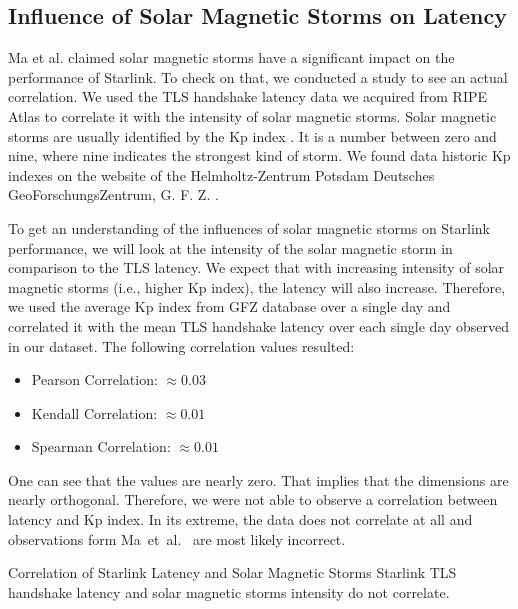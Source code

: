 \subsection{Influence of Solar Magnetic Storms on Latency}
\label{sec:solarmagnetic-storms}

Ma et al. \cite{DBLP:conf/infocom/MaCZCML23} claimed solar magnetic storms have
a significant impact on the performance of Starlink. To check on that, we
conducted a study to see an actual correlation. We used the TLS handshake
latency data we acquired from RIPE Atlas to correlate it with the intensity of
solar magnetic storms. Solar magnetic storms are usually identified by the Kp
index \cite{Bartels1957}. It is a number between zero and nine, where nine
indicates the strongest kind of storm. We found data historic Kp indexes on the
website of the Helmholtz-Zentrum Potsdam Deutsches GeoForschungsZentrum, G. F.
Z. \cite{GFZ2023}.

To get an understanding of the influences of solar magnetic storms on Starlink
performance, we will look at the intensity of the solar magnetic storm in
comparison to the TLS latency. We expect that with increasing intensity of
solar magnetic storms (i.e., higher Kp index), the latency will also increase.
Therefore, we used the average Kp index from GFZ database over a single day and
correlated it with the mean TLS handshake latency over each single day observed
in our dataset. The following correlation values resulted:

\begin{itemize}
	\item Pearson Correlation: $\approx 0.03$
	\item Kendall Correlation: $\approx 0.01$
	\item Spearman Correlation: $\approx 0.01$
\end{itemize}

One can see that the values are nearly zero. That implies that the dimensions
are nearly orthogonal. Therefore, we were not able to observe a correlation
between latency and Kp index. In its extreme, the data does not correlate at
all and observations form Ma~et~al.~\cite{DBLP:conf/infocom/MaCZCML23} are most
likely incorrect.

\begin{takeaway}{Correlation of Starlink Latency and Solar Magnetic Storms}
	Starlink TLS handshake latency and solar magnetic storms intensity do
	not correlate.
\end{takeaway}

